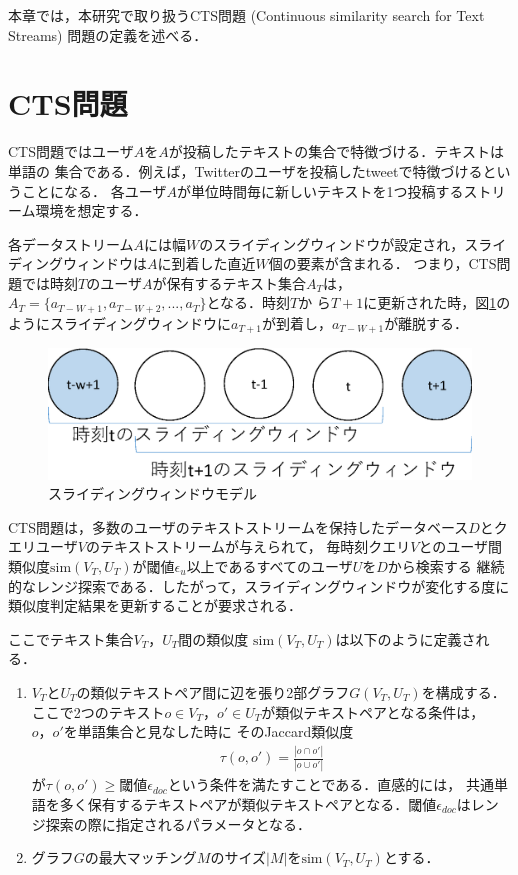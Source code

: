 本章では，本研究で取り扱うCTS問題 (Continuous similarity search for Text Streams) 問題\cite{kubo}の定義を述べる．

\section{CTS問題}

CTS問題ではユーザ$A$を$A$が投稿したテキストの集合で特徴づける．テキストは単語の
集合である．例えば，Twitterのユーザを投稿したtweetで特徴づけるということになる．
各ユーザ$A$が単位時間毎に新しいテキストを1つ投稿するストリーム環境を想定する．

各データストリーム$A$には幅$W$のスライディングウィンドウが設定され，スライディングウィンドウは$A$に到着した直近$W$個の要素が含まれる．
つまり，CTS問題では時刻$T$のユーザ$A$が保有するテキスト集合$A_T$は，$A_T=\{a_{T-W+1},a_{T-W+2},...,a_T\}$となる．時刻$T$か
ら$T+1$に更新された時，図\ref{sw}のようにスライディングウィンドウに$a_{T+1}$が到着し，$a_{T-W+1}$が離脱する．
\begin{figure}[htb]
  \begin{center}
    \includegraphics[clip,width=\linewidth]{img/sw.eps}
    \caption{スライディングウィンドウモデル}
    \label{sw}
  \end{center}
\end{figure}

CTS問題は，多数のユーザのテキストストリームを保持したデータベース$D$とクエリユーザ$V$のテキストストリームが与えられて，
毎時刻クエリ$V$とのユーザ間類似度$\mbox{sim}(V_T,U_T)$が閾値$\epsilon_u$以上であるすべてのユーザ$U$を$D$から検索する
継続的なレンジ探索である．したがって，スライディングウィンドウが変化する度に類似度判定結果を更新することが要求される．

ここでテキスト集合$V_T，U_T$間の類似度 $\mbox{sim}(V_T,U_T)$は以下のように定義される．
\begin{enumerate}
\item $V_T$と$U_T$の類似テキストペア間に辺を張り2部グラフ$G(V_T,U_T)$を構成する．
ここで2つのテキスト$o\in V_T，o'\in U_T$が類似テキストペアとなる条件は，$o，o'$を単語集合と見なした時に
そのJaccard類似度
\begin{align}
\label{match}
\tau (o,o')=\frac{|o\cap o'|}{|o\cup o'|}
\end{align}
が$\tau (o,o')\geq \mbox{閾値}\epsilon_{doc}$という条件を満たすことである．直感的には，
共通単語を多く保有するテキストペアが類似テキストペアとなる．閾値$\epsilon_{doc}$はレンジ探索の際に指定されるパラメータとなる．
\item グラフ$G$の最大マッチング$M$のサイズ$|M|$を$\mbox{sim}(V_T,U_T)$とする．
\end{enumerate}

